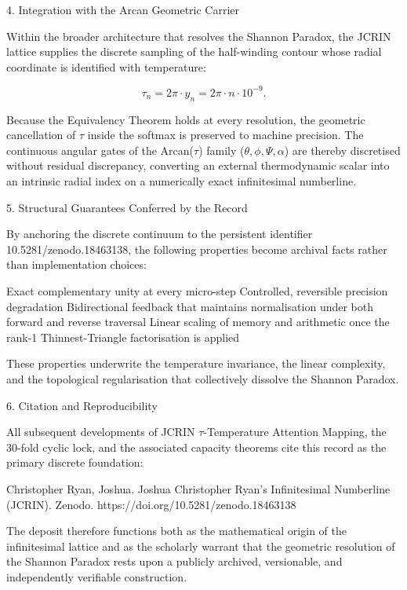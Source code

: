 4. Integration with the Arcan Geometric Carrier

Within the broader architecture that resolves the Shannon Paradox, the JCRIN lattice supplies the discrete sampling of the half-winding contour whose radial coordinate is identified with temperature:

\[
\tau_n = 2\pi\cdot y_n = 2\pi\cdot n\cdot 10^{-9}.
\]

Because the Equivalency Theorem holds at every resolution, the geometric cancellation of \(\tau\) inside the softmax is preserved to machine precision. The continuous angular gates of the Arcan(\(\tau\)) family (\(\theta,\phi,\Psi,\alpha\)) are thereby discretised without residual discrepancy, converting an external thermodynamic scalar into an intrinsic radial index on a numerically exact infinitesimal numberline.

5. Structural Guarantees Conferred by the Record

By anchoring the discrete continuum to the persistent identifier 10.5281/zenodo.18463138, the following properties become archival facts rather than implementation choices:

Exact complementary unity at every micro-step  
Controlled, reversible precision degradation  
Bidirectional feedback that maintains normalisation under both forward and reverse traversal  
Linear scaling of memory and arithmetic once the rank-1 Thinnest-Triangle factorisation is applied  

These properties underwrite the temperature invariance, the linear complexity, and the topological regularisation that collectively dissolve the Shannon Paradox.

6. Citation and Reproducibility

All subsequent developments of JCRIN \(\tau\)-Temperature Attention Mapping, the 30-fold cyclic lock, and the associated capacity theorems cite this record as the primary discrete foundation:

Christopher Ryan, Joshua. Joshua Christopher Ryan’s Infinitesimal Numberline (JCRIN). Zenodo. https://doi.org/10.5281/zenodo.18463138

The deposit therefore functions both as the mathematical origin of the infinitesimal lattice and as the scholarly warrant that the geometric resolution of the Shannon Paradox rests upon a publicly archived, versionable, and independently verifiable construction.
